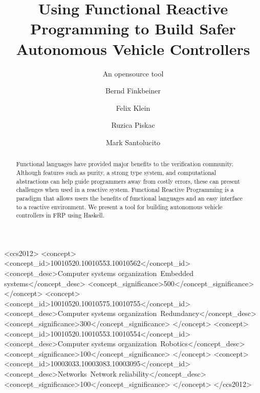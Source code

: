 \documentclass[sigconf]{acmart}
\begin{document}
\title{Using Functional Reactive Programming to Build Safer Autonomous Vehicle Controllers}
\subtitle{An opensource tool}

\author{Bernd Finkbeiner}

\author{Felix Klein}

\author{Ruzica Piskac}

\author{Mark Santolucito}
\begin{abstract}
Functional languages have provided major benefits to the verification community.
Although features such as purity, a strong type system, and computational abstractions can help guide programmers away from costly errors, these can present challenges when used in a reactive system.
Functional Reactive Programming is a paradigm that allows users the benefits of functional languages and an easy interface to a reactive environment.
We present a tool for building autonomous vehicle controllers in FRP using Haskell.
\end{abstract}

%
%
\begin{CCSXML}
<ccs2012>
 <concept>
  <concept_id>10010520.10010553.10010562</concept_id>
  <concept_desc>Computer systems organization~Embedded systems</concept_desc>
  <concept_significance>500</concept_significance>
 </concept>
 <concept>
  <concept_id>10010520.10010575.10010755</concept_id>
  <concept_desc>Computer systems organization~Redundancy</concept_desc>
  <concept_significance>300</concept_significance>
 </concept>
 <concept>
  <concept_id>10010520.10010553.10010554</concept_id>
  <concept_desc>Computer systems organization~Robotics</concept_desc>
  <concept_significance>100</concept_significance>
 </concept>
 <concept>
  <concept_id>10003033.10003083.10003095</concept_id>
  <concept_desc>Networks~Network reliability</concept_desc>
  <concept_significance>100</concept_significance>
 </concept>
</ccs2012>  
\end{CCSXML}
\end{document}
